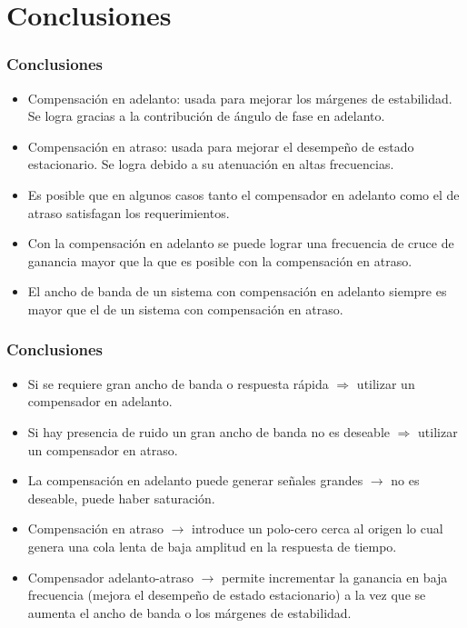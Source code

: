 \documentclass[aspectratio=169,handout]{beamer}
\theoremstyle{definition}
\theoremstyle{plain}
\theoremstyle{remark}
\begin{document}
\section{Conclusiones}
\begin{frame}[<+->]\frametitle{Conclusiones}
\begin{itemize}
	\item Compensación en adelanto: usada para mejorar los márgenes de estabilidad. Se logra gracias a la contribución de ángulo de fase en adelanto.
	\item Compensación en atraso: usada para mejorar el desempeño de estado estacionario. Se logra debido a su atenuación en altas frecuencias.
	\item Es posible que en algunos casos tanto el compensador en adelanto como el de atraso satisfagan los requerimientos.
	\item Con la compensación en adelanto se puede lograr una frecuencia de cruce de ganancia mayor que la que es posible con la compensación en atraso.
	\item El ancho de banda de un sistema con compensación en adelanto siempre es mayor que el de un sistema con compensación en atraso.
\end{itemize}
\end{frame}

\begin{frame}[<+->]\frametitle{Conclusiones}
\begin{itemize}
	\item Si se requiere gran ancho de banda o respuesta rápida $\Rightarrow$ utilizar un compensador en adelanto.
	\item Si hay presencia de ruido un gran ancho de banda no es deseable $\Rightarrow$ utilizar un compensador en atraso.
	\item La compensación en adelanto puede generar señales grandes $\rightarrow$ no es deseable, puede haber saturación.
	\item Compensación en atraso $\rightarrow$ introduce un polo-cero cerca al origen lo cual genera una cola lenta de baja amplitud en la respuesta de tiempo.
	\item Compensador adelanto-atraso $\rightarrow$ permite incrementar la ganancia en baja frecuencia (mejora el desempeño de estado estacionario) a la vez que se aumenta el ancho de banda o los márgenes de estabilidad. 
\end{itemize}
\end{frame}
\end{document}
